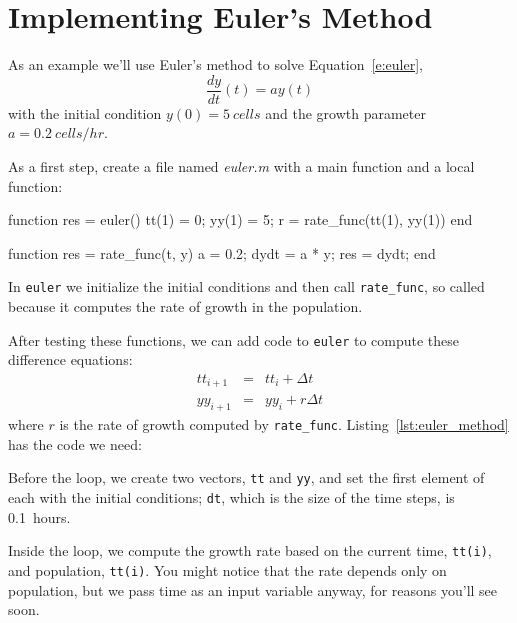 

\section{Implementing Euler's Method}

As an example we'll use Euler's method to solve Equation~\ref{e:euler},
\[ \frac{dy}{dt}(t) = a y(t) \]
with the initial condition $y(0) = \SI{5}{cells}$  and
the growth parameter $a = \SI{0.2}{cells/hr}$.


As a first step, create a file named \emph{euler.m} with a main function and a local function:

\begin{code}
function res = euler()
    tt(1) = 0;
    yy(1) = 5;
    r = rate_func(tt(1), yy(1))
end

function res = rate_func(t, y)
   a = 0.2;
   dydt = a * y;
   res = dydt;
end
\end{code}

In \lstinline{euler} we initialize the initial conditions and then call \lstinline{rate_func}, so called because it computes the rate of growth in the population.


After testing these functions, we can add code to \lstinline{euler} to compute these difference equations:
\begin{eqnarray*}
tt_{i+1} &=&tt_i + \Delta t             \\
yy_{i+1} &=& yy_i + r \Delta t
\end{eqnarray*}
%
where $r$ is the rate of growth computed by \lstinline{rate_func}.
Listing~\ref{lst:euler_method} has the code we need:



Before the loop, we create two vectors, \lstinline{tt} and \lstinline{yy}, and set the first element of each with the initial conditions;  \lstinline{dt}, which is the size of the time steps, is \SI{0.1}{hours}.

Inside the loop, we compute the growth rate based on the current time, \lstinline{tt(i)}, and population, \lstinline{tt(i)}.  You might notice that the rate depends only on population, but we pass time as an input variable anyway, for reasons you'll see soon.

